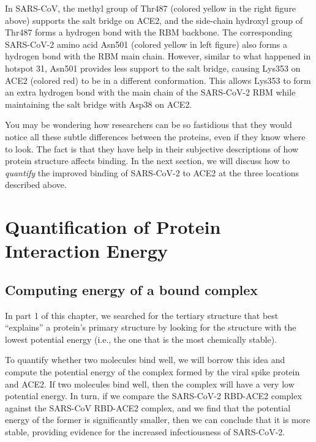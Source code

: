 In SARS-CoV, the methyl group of Thr487 (colored yellow in the right figure above) supports the salt bridge on ACE2, and the side-chain hydroxyl group of Thr487 forms a hydrogen bond with the RBM backbone. The corresponding SARS-CoV-2 amino acid Asn501 (colored yellow in left figure) also forms a hydrogen bond with the RBM main chain. However, similar to what happened in hotspot 31, Asn501 provides less support to the salt bridge, causing Lys353 on ACE2 (colored red) to be in a different conformation. This allows Lys353 to form an extra hydrogen bond with the main chain of the SARS-CoV-2 RBM while maintaining the salt bridge with Asp38 on ACE2.

You may be wondering how researchers can be so fastidious that they would notice all these subtle differences between the proteins, even if they know where to look. The fact is that they have help in their subjective descriptions of how protein structure affects binding. In the next section, we will discuss how to \textit{quantify} the improved binding of SARS-CoV-2 to ACE2 at the three locations described above.\\

\FloatBarrier
{}

\section{Quantification of Protein Interaction Energy}
\label{sec:interaction_energy}
\subsection{Computing energy of a bound complex}

In part 1 of this chapter, we searched for the tertiary structure that best ``explains'' a protein's primary structure by looking for the structure with the lowest potential energy (i.e., the one that is the most chemically stable).

To quantify whether two molecules bind well, we will borrow this idea and compute the potential energy of the complex formed by the viral spike protein and ACE2. If two molecules bind well, then the complex will have a very low potential energy. In turn, if we compare the SARS-CoV-2 RBD-ACE2 complex against the SARS-CoV RBD-ACE2 complex, and we find that the potential energy of the former is significantly smaller, then we can conclude that it is more stable, providing evidence for the increased infectiousness of SARS-CoV-2.

